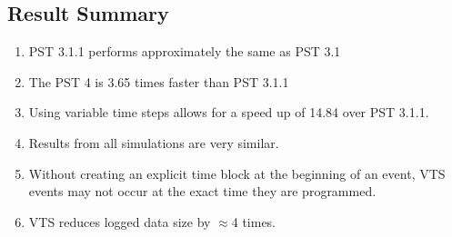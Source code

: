 \subsection{Result Summary} 
\begin{enumerate}
 em
\item PST 3.1.1 performs approximately the same as PST 3.1
\item The PST 4 is 3.65 times faster than PST 3.1.1
\item Using variable time steps allows for a speed up of 14.84 over PST 3.1.1.
\item Results from all simulations are very similar.
\item Without creating an explicit time block at the beginning of an event, VTS events may not occur at the exact time they are programmed.
\item VTS reduces logged data size by $\approx$4 times.
\end{enumerate}


\begin{table}[!ht]
	



\end{table}


\pagebreak

